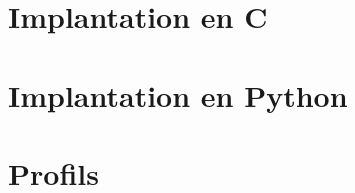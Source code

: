 \chapter{Implantation en C}
\label{Impl:C}
%
\chapter{Implantation en Python}
\label{Impl:Py}
%
\chapter{Profils}
\begin{figure}[hlc]
\center
\end{figure}

